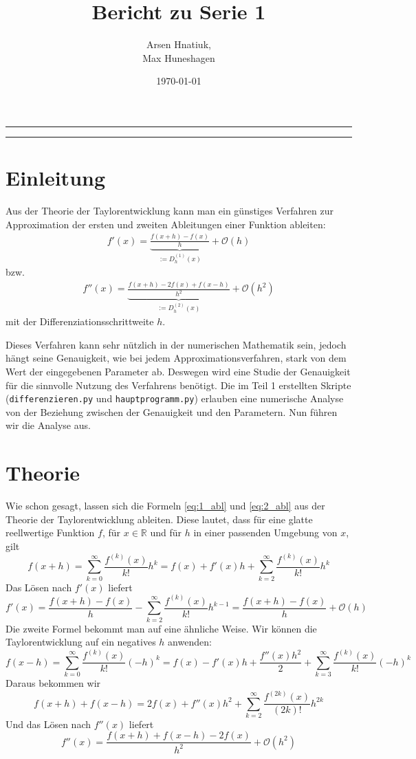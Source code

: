 \documentclass[smallheadings]{scrartcl}
\title{Bericht zu Serie 1}
\author{%
  Arsen Hnatiuk,\\%
  Max Huneshagen 
}
\date{\today}
\begin{document}
\maketitle
\tableofcontents
\bigskip

\hrule
\hrule


\section{Einleitung}
Aus der Theorie der Taylorentwicklung kann man ein günstiges Verfahren zur Approximation der ersten und zweiten Ableitungen einer Funktion ableiten: 
\begin{align}
\label{eq:1_abl}
f'(x)=\underbrace{\frac{f(x+h)-f(x)}{h}}_{:=D_h^{(1)}(x)}+\mathcal{O}(h)
\end{align}
bzw.
\begin{align}
\label{eq:2_abl}
f''(x)=\underbrace{\frac{f(x+h)-2f(x)+f(x-h)}{h^2}}_{:=D_h^{(2)}(x)}+\mathcal{O}(h^2)
\end{align}
mit der Differenziationsschrittweite $h$.

Dieses Verfahren kann sehr nützlich in der numerischen Mathematik sein, jedoch hängt seine Genauigkeit, wie bei jedem Approximationsverfahren, stark von dem Wert der eingegebenen Parameter ab. Deswegen wird eine Studie der Genauigkeit für die sinnvolle Nutzung des Verfahrens benötigt. Die im Teil 1 erstellten Skripte (\texttt{differenzieren.py} und \texttt{hauptprogramm.py}) erlauben eine numerische Analyse von der Beziehung zwischen der Genauigkeit und den Parametern. Nun führen wir die Analyse aus.

\section{Theorie}
Wie schon gesagt, lassen sich die Formeln \ref{eq:1_abl} und \ref{eq:2_abl} aus der Theorie der Taylorentwicklung ableiten. Diese lautet, dass für eine glatte reellwertige Funktion $f$, für $x\in\mathbb{R}$ und für $h$ in einer passenden Umgebung von $x$, gilt
\[f(x+h)=\sum_{k=0}^{\infty}\frac{f^{(k)}(x)}{k!}h^k=f(x)+f'(x)h+\sum_{k=2}^{\infty}\frac{f^{(k)}(x)}{k!}h^k\]
Das Lösen nach $f'(x)$ liefert
\[f'(x)=\frac{f(x+h)-f(x)}{h}-\sum_{k=2}^{\infty}\frac{f^{(k)}(x)}{k!}h^{k-1}=\frac{f(x+h)-f(x)}{h}+\mathcal{O}(h)\]
Die zweite Formel bekommt man auf eine ähnliche Weise. Wir können die Taylorentwicklung auf ein negatives $h$ anwenden:
\[f(x-h)=\sum_{k=0}^{\infty}\frac{f^{(k)}(x)}{k!}(-h)^k=f(x)-f'(x)h+\frac{f''(x)h^2}{2} +\sum_{k=3}^{\infty}\frac{f^{(k)}(x)}{k!}(-h)^k\]
Daraus bekommen wir
\[f(x+h)+f(x-h)=2f(x)+f''(x)h^2+\sum_{k=2}^{\infty}\frac{f^{(2k)}(x)}{(2k)!}h^{2k}\]
Und das Lösen nach $f''(x)$ liefert
\[f''(x)=\frac{f(x+h)+f(x-h)-2f(x)}{h^2}+\mathcal{O}(h^2)\]
\end{document}
